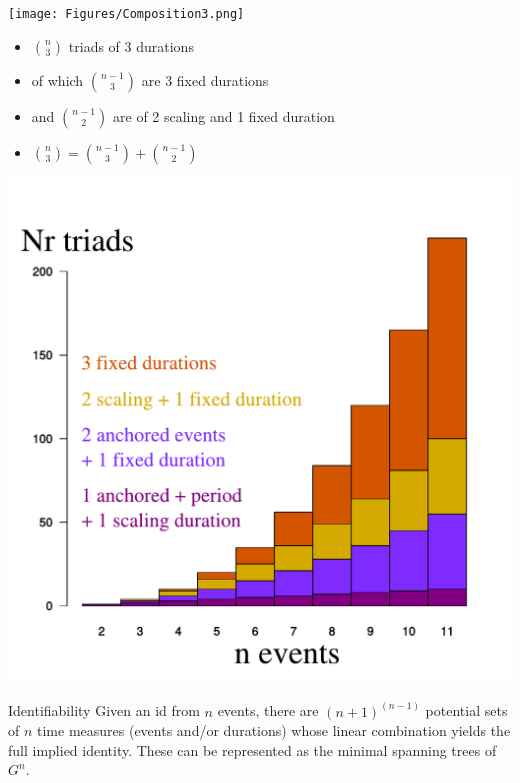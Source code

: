 \documentclass[20pt]{beamer}
\begin{document}
\begin{frame}[plain]
\Large

\begin{center}
\texttt{[image: Figures/Composition3.png]}
\end{center}
\begin{itemize}[<+->]
  \item $\binom{n}{3}$ triads of 3 durations
  \item of which $\binom{n-1}{3}$ are 3 fixed
  durations
  \item and $\binom{n-1}{2}$ are of 2 scaling and 1 fixed duration
  \item $\binom{n}{3} = \binom{n-1}{3} + \binom{n-1}{2}$
\end{itemize}
\end{frame}


\begin{frame}[plain]

\begin{center}
\includegraphics[scale=1]{Figures/id3compmarked.pdf}
\end{center}

\end{frame}


\begin{frame}[plain]
\Large

\begin{block}{Identifiability}
Given an id from $n$ events, there are $(n+1)^{(n-1)}$ potential sets of $n$
time measures (events and/or durations) whose linear combination yields the full
implied identity. These can be represented as the minimal spanning trees of $G^n$.
\end{block}

\end{frame}
\end{document}
